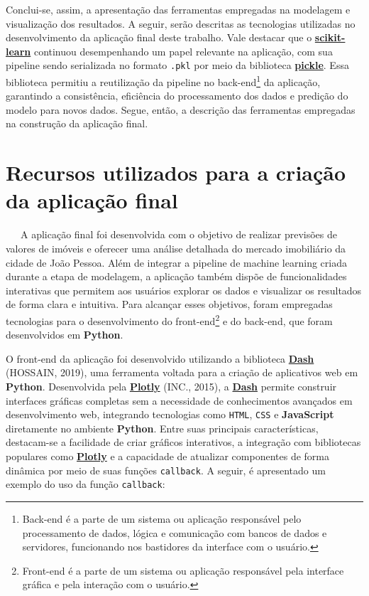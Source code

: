 \documentclass[
  12pt,
  a4paper,
]{scrreprt}
\begin{document}
\vspace{12pt}

Conclui-se, assim, a apresentação das ferramentas empregadas na
modelagem e visualização dos resultados. A seguir, serão descritas as
tecnologias utilizadas no desenvolvimento da aplicação final deste
trabalho. Vale destacar que o
\href{https://scikit-learn.org/stable/}{\textbf{scikit-learn}} continuou
desempenhando um papel relevante na aplicação, com sua pipeline sendo
serializada no formato \texttt{.pkl} por meio da biblioteca
\href{https://docs.python.org/3/library/pickle.html}{\textbf{pickle}}.
Essa biblioteca permitiu a reutilização da pipeline no
back-end\footnote{Back-end é a parte de um sistema ou aplicação
  responsável pelo processamento de dados, lógica e comunicação com
  bancos de dados e servidores, funcionando nos bastidores da interface
  com o usuário.} da aplicação, garantindo a consistência, eficiência do
processamento dos dados e predição do modelo para novos dados. Segue,
então, a descrição das ferramentas empregadas na construção da aplicação
final.

\section{Recursos utilizados para a criação da aplicação
final}\label{recursos-utilizados-para-a-criauxe7uxe3o-da-aplicauxe7uxe3o-final}

~~~A aplicação final foi desenvolvida com o objetivo de realizar
previsões de valores de imóveis e oferecer uma análise detalhada do
mercado imobiliário da cidade de João Pessoa. Além de integrar a
pipeline de machine learning criada durante a etapa de modelagem, a
aplicação também dispõe de funcionalidades interativas que permitem aos
usuários explorar os dados e visualizar os resultados de forma clara e
intuitiva. Para alcançar esses objetivos, foram empregadas tecnologias
para o desenvolvimento do front-end\footnote{Front-end é a parte de um
  sistema ou aplicação responsável pela interface gráfica e pela
  interação com o usuário.} e do back-end, que foram desenvolvidos em
\textbf{Python}.

\vspace{12pt}

O front-end da aplicação foi desenvolvido utilizando a biblioteca
\href{https://dash.plotly.com/}{\textbf{Dash}} (HOSSAIN, 2019), uma
ferramenta voltada para a criação de aplicativos web em \textbf{Python}.
Desenvolvida pela \href{https://plotly.com/}{\textbf{Plotly}} (INC.,
2015), a \href{https://dash.plotly.com/}{\textbf{Dash}} permite
construir interfaces gráficas completas sem a necessidade de
conhecimentos avançados em desenvolvimento web, integrando tecnologias
como \texttt{HTML}, \texttt{CSS} e \textbf{JavaScript} diretamente no
ambiente \textbf{Python}. Entre suas principais características,
destacam-se a facilidade de criar gráficos interativos, a integração com
bibliotecas populares como \href{https://plotly.com/}{\textbf{Plotly}} e
a capacidade de atualizar componentes de forma dinâmica por meio de suas
funções \texttt{callback}. A seguir, é apresentado um exemplo do uso da
função \texttt{callback}:
\end{document}
